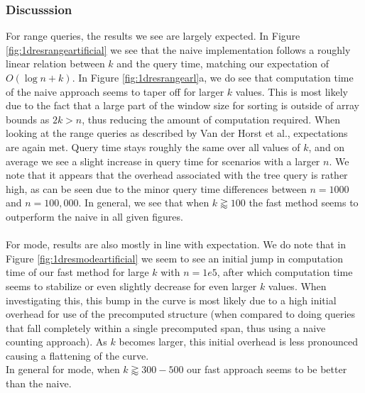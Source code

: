 \documentclass{article}
\newcommand{\fb}[1]{{#1}}
\newcommand{\fbrm}[1]{{}}
\begin{document}
\subsubsection*{Discusssion}
For range queries, the results we see are largely expected. In Figure \ref{fig:1dresrangeartificial} we see that the naive implementation follows a roughly linear relation between $k$ and the query time, mat\fb{ch}ing our expectation of \fbrm{it being} $O(\log n + k)$. In Figure \ref{fig:1dresrangearl}a, we do see that computation time of the naive approach seems to taper off for larger $k$ values. This is most likely due to the fact that a large part of the window size for sorting is outside of array bounds as $2k > n$, thus reducing the amount of computation required. 
When looking at the range queries as described by Van der Horst et al., expectations are again met. Query time stays roughly the same over all values of $k$, and on average we see a slight increase in query time for scenarios with a larger $n$. We note that it appears that the overhead associated with the tree query is rather high, as can be seen due to the minor query time differences between $n=1000$ and $n=100,000$. In general, we see that when $k \gtrapprox 100$ the fast method seems to outperform the naive in all given figures. \\\\
\fb{
    For mode, results are also mostly in line with expectation. We do note that in Figure \ref{fig:1dresmodeartificial} we seem to see an initial jump in computation time of our fast method for large $k$ with $n=1e5$, after which computation time seems to stabilize or even slightly decrease for even larger $k$ values. When investigating this, this bump in the curve is most likely due to a high initial overhead for use of the precomputed structure (when compared to doing queries that fall completely within a single precomputed span, thus using a naive counting approach). As $k$ becomes larger, this initial overhead is less pronounced causing a flattening of the curve. \\
    In general for mode, when $k \gtrapprox 300-500$ our fast approach seems to be better than the naive.
}
\end{document}
